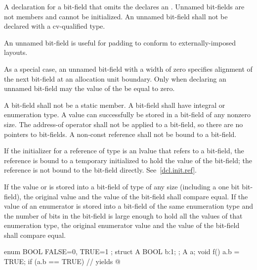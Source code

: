 \pnum
{}%
A declaration for a bit-field that omits the 
declares an . Unnamed bit-fields are not
members and cannot be initialized.
An unnamed bit-field shall not be declared with a cv-qualified type.
\begin{note}
An unnamed bit-field is useful for padding to conform to
externally-imposed layouts.
\end{note}
%
%
As a special case, an unnamed bit-field with a width of zero specifies
alignment of the next bit-field at an allocation unit boundary. Only
when declaring an unnamed bit-field may the value of the
 be equal to zero.

\pnum
{}%
A bit-field shall not be a static member. A bit-field shall have
integral or enumeration type.
%
A  value can successfully be stored in a bit-field of any
nonzero size.
%
The address-of operator \tcode{\&} shall not be applied to a bit-field,
so there are no pointers to bit-fields.
%
%
%
A non-const reference shall not be bound to a
bit-field.
\begin{note}
If the initializer for a reference of type   is
an lvalue that refers to a bit-field, the reference is bound to a
temporary initialized to hold the value of the bit-field; the reference
is not bound to the bit-field directly. See~\ref{dcl.init.ref}.
\end{note}

\pnum
If the value  or  is stored into a bit-field of
type  of any size (including a one bit bit-field), the
original  value and the value of the bit-field shall compare
equal. If the value of an enumerator is stored into a bit-field of the
same enumeration type and the number of bits in the bit-field is large
enough to hold all the values of that enumeration type,
the original enumerator value and the value of the bit-field shall
compare equal.
\begin{example}

\begin{codeblock}
enum BOOL { FALSE=0, TRUE=1 };
struct A {
  BOOL b:1;
};
A a;
void f() {
  a.b = TRUE;
  if (a.b == TRUE)              // yields 
    { @\commentellip@ }
}
\end{codeblock}
\end{example}

